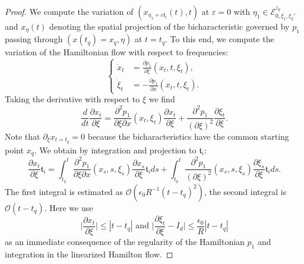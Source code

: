 \documentclass{amsart}
\theoremstyle{definition}
\begin{document}
\begin{proof}
We compute the variation of $(x_{\eta_1 + \varepsilon \mathfrak{t}_i}(t),t)$ at $\varepsilon = 0$ with $\eta_1 \in \mathcal{E}^{z_q}_{0,\xi_1,\xi_2'}$ and $x_{\eta}(t)$ denoting the spatial projection of the bicharacteristic governed by $p_1$ passing through $(x(t_q)=x_q,\eta)$ at $t=t_q$. To this end, we compute the variation of the Hamiltonian flow with respect to frequencies:
\begin{equation*}
\left\{ \begin{array}{cl}
\dot{x}_t &= \frac{\partial p_1}{\partial \xi}(x_t,t,\xi_t), \\
\dot{\xi}_t &= - \frac{\partial p_1}{\partial x}(x_t,t,\xi_t).
\end{array} \right.
\end{equation*}
Taking the derivative with respect to $\xi$ we find
\begin{equation*}
\frac{d}{dt} \frac{\partial x_t}{\partial \xi} = \frac{\partial^2 p_1}{\partial \xi \partial x}(x_t,\xi_t) \frac{\partial x_t}{\partial \xi} + \frac{\partial^2 p_1}{(\partial \xi)^2} \frac{\partial \xi_t}{\partial \xi}.
\end{equation*}
Note that $\partial_{\xi} x_{t = t_q} = 0$ because the bicharacteristics have the common starting point $x_q$. We obtain by integration and projection to $\mathfrak{t}_i$:
\begin{equation*}
\frac{\partial x_t}{\partial \xi} \mathfrak{t}_i = \int_{t_q}^{t} \frac{\partial^2 p_1}{\partial \xi \partial x}(x_s,s,\xi_s) \frac{\partial x_s}{\partial \xi} \mathfrak{t}_i ds + \int_{t_q}^{t} \frac{\partial^2 p_1}{(\partial \xi)^2}(x_s,s,\xi_s) \frac{\partial \xi_s}{\partial \xi} \mathfrak{t}_i ds.
\end{equation*}
The first integral is estimated as $\mathcal{O}(\epsilon_0 R^{-1} (t-t_q)^2)$, the second integral is $\mathcal{O}(t-t_q)$. Here we use
\begin{equation*}
\big| \frac{\partial x_t}{\partial \xi} \big| \leq  |t-t_q| \text{ and } \big| \frac{\partial \xi_t}{\partial \xi} - I_d \big| \leq \frac{\epsilon_0}{R} |t-t_q|
\end{equation*}
as an immediate consequence of the regularity of the Hamiltonian $p_1$ and integration
in the linearized Hamilton flow.


\end{proof}
\end{document}
